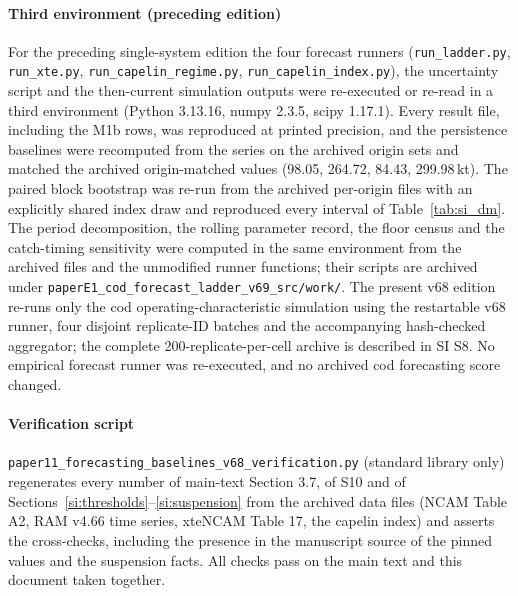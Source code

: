 \paragraph{Third environment (preceding edition)} For the preceding single-system edition the four forecast runners (\texttt{run\_ladder.py}, \texttt{run\_xte.py}, \texttt{run\_capelin\_regime.py}, \texttt{run\_capelin\_index.py}), the uncertainty script and the then-current simulation outputs were re-executed or re-read in a third environment (Python 3.13.16, numpy 2.3.5, scipy 1.17.1). Every result file, including the M1b rows, was reproduced at printed precision, and the persistence baselines were recomputed from the series on the archived origin sets and matched the archived origin-matched values (98.05, 264.72, 84.43, 299.98\,kt). The paired block bootstrap was re-run from the archived per-origin files with an explicitly shared index draw and reproduced every interval of Table~\ref{tab:si_dm}. The period decomposition, the rolling parameter record, the floor census and the catch-timing sensitivity were computed in the same environment from the archived files and the unmodified runner functions; their scripts are archived under \texttt{paperE1\_cod\_forecast\_ladder\_v69\_src/work/}. The present v68 edition re-runs only the cod operating-characteristic simulation using the restartable v68 runner, four disjoint replicate-ID batches and the accompanying hash-checked aggregator; the complete 200-replicate-per-cell archive is described in SI S8. No empirical forecast runner was re-executed, and no archived cod forecasting score changed.

\paragraph{Verification script} \texttt{paper11\_forecasting\_\allowbreak{}baselines\_v68\_\allowbreak{}verification.py} (standard library only) regenerates every number of main-text Section 3.7, of S10 and of Sections~\ref{si:thresholds}--\ref{si:suspension} from the archived data files (NCAM Table A2, RAM v4.66 time series, xteNCAM Table 17, the capelin index) and asserts the cross-checks, including the presence in the manuscript source of the pinned values and the suspension facts. All checks pass on the main text and this document taken together.

